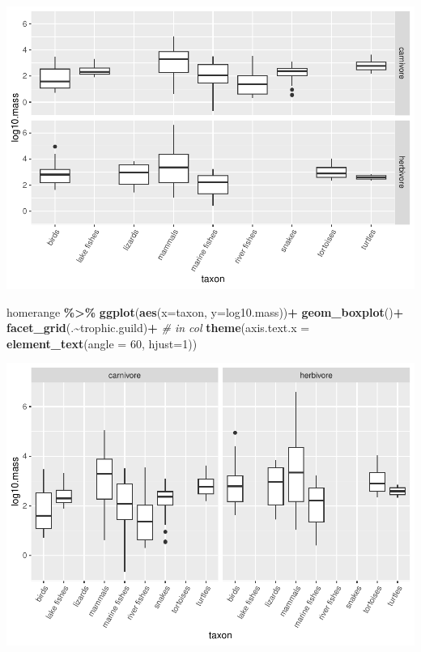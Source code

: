 \documentclass[
]{article}
\newenvironment{Shaded}{\begin{snugshade}}{\end{snugshade}}
\newcommand{\AttributeTok}[1]{\textcolor[rgb]{0.13,0.29,0.53}{#1}}
\newcommand{\CommentTok}[1]{\textcolor[rgb]{0.56,0.35,0.01}{\textit{#1}}}
\newcommand{\DecValTok}[1]{\textcolor[rgb]{0.00,0.00,0.81}{#1}}
\newcommand{\FunctionTok}[1]{\textcolor[rgb]{0.13,0.29,0.53}{\textbf{#1}}}
\newcommand{\NormalTok}[1]{#1}
\newcommand{\SpecialCharTok}[1]{\textcolor[rgb]{0.81,0.36,0.00}{\textbf{#1}}}
\begin{document}
\includegraphics{Untitled_files/figure-latex/unnamed-chunk-45-1.pdf}

\begin{Shaded}
\begin{Highlighting}[]
\NormalTok{homerange }\SpecialCharTok{\%\textgreater{}\%} 
  \FunctionTok{ggplot}\NormalTok{(}\FunctionTok{aes}\NormalTok{(}\AttributeTok{x=}\NormalTok{taxon, }\AttributeTok{y=}\NormalTok{log10.mass))}\SpecialCharTok{+}
  \FunctionTok{geom\_boxplot}\NormalTok{()}\SpecialCharTok{+}
  \FunctionTok{facet\_grid}\NormalTok{(.}\SpecialCharTok{\textasciitilde{}}\NormalTok{trophic.guild)}\SpecialCharTok{+} \CommentTok{\# in col }
  \FunctionTok{theme}\NormalTok{(}\AttributeTok{axis.text.x =} \FunctionTok{element\_text}\NormalTok{(}\AttributeTok{angle =} \DecValTok{60}\NormalTok{, }\AttributeTok{hjust=}\DecValTok{1}\NormalTok{))}
\end{Highlighting}
\end{Shaded}

\includegraphics{Untitled_files/figure-latex/unnamed-chunk-46-1.pdf}
\end{document}
